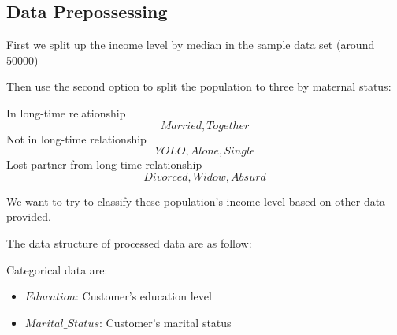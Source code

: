 
\subsection{Data Prepossessing}

\hfill

First we split up the income level by median in the sample data set (around 50000)

Then use the second option to split the population to three by maternal status:

In long-time relationship \[Married, Together\]
Not in long-time relationship \[YOLO, Alone, Single\]
Lost partner from long-time relationship \[Divorced, Widow, Absurd\]

We want to try to classify these population's income level based on other data provided.

The data structure of processed data are as follow:

Categorical data are:

\begin{itemize}
    \item
          $Education$: Customer's education level
    \item
          $Marital\_Status$: Customer's marital status
\end{itemize}

